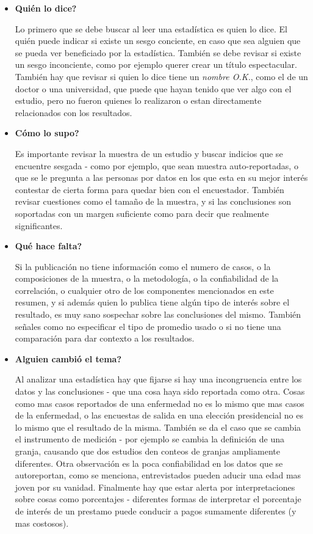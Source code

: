 \documentclass[letterpaper, 11pt]{article}
\begin{document}
\begin{itemize}
	\item \textbf{Quién lo dice?}

	Lo primero que se debe buscar al leer una estadística es quien lo dice. El quién puede indicar si existe un sesgo conciente, en caso que sea alguien que se pueda ver beneficiado por la estadística. También se debe revisar si existe un sesgo inconciente, como por ejemplo querer crear un título espectacular. También hay que revisar si quien lo dice tiene un \textit{nombre O.K.}, como el de un doctor o una universidad, que puede que hayan tenido que ver algo con el estudio, pero no fueron quienes lo realizaron o estan directamente relacionados con los resultados.

	\item \textbf{Cómo lo supo?}
	
	Es importante revisar la muestra de un estudio y buscar indicios que se encuentre sesgada - como por ejemplo, que sean muestra auto-reportadas, o que se le pregunta a las personas por datos en los que esta en su mejor interés contestar de cierta forma para quedar bien con el encuestador. También revisar cuestiones como el tamaño de la muestra, y si las conclusiones son soportadas con un margen suficiente como para decir que realmente significantes. 
	
	\item \textbf{Qué hace falta?}
	
	Si la publicación no tiene información como el numero de casos, o la composiciones de la muestra, o la metodología, o la confiabilidad de la correlación, o cualquier otro de los componentes mencionados en este resumen, y si además quien lo publica tiene algún tipo de interés sobre el resultado, es muy sano sospechar sobre las conclusiones del mismo. También señales como no especificar el tipo de promedio usado o si no tiene una comparación para dar contexto a los resultados. 
	
	\item \textbf{Alguien cambió el tema?}
	
	Al analizar una estadística hay que fijarse si hay una incongruencia entre los datos y las conclusiones - que una cosa haya sido reportada como otra. Cosas como mas casos reportados de una enfermedad no es lo mismo que mas casos de la enfermedad, o las encuestas de salida en una elección presidencial no es lo mismo que el resultado de la misma. También se da el caso que se cambia el instrumento de medición - por ejemplo se cambia la definición de una granja, causando que dos estudios den conteos de granjas ampliamente diferentes. Otra observación es la poca confiabilidad en los datos que se autoreportan, como se menciona, entrevistados pueden aducir una edad mas joven por su vanidad. Finalmente hay que estar alerta por interpretaciones sobre cosas como porcentajes - diferentes formas de interpretar el porcentaje de interés de un prestamo puede conducir a pagos sumamente diferentes (y mas costosos).
	

\end{itemize}
\end{document}
